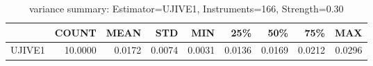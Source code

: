 \begin{table}[ht]
\centering
\caption{variance summary: Estimator=UJIVE1, Instruments=166, Strength=0.30}
\begin{tabular}{lrrrrrrrr}
\toprule
 & COUNT & MEAN & STD & MIN & 25\% & 50\% & 75\% & MAX \\
\midrule
UJIVE1 & 10.0000 & 0.0172 & 0.0074 & 0.0031 & 0.0136 & 0.0169 & 0.0212 & 0.0296 \\
\bottomrule
\end{tabular}
\end{table}
